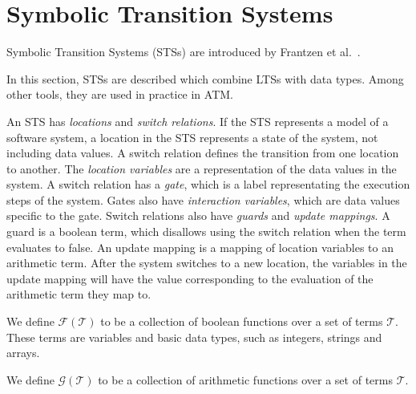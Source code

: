 \section{Symbolic Transition Systems}\label{sec:symbolic}
Symbolic Transition Systems (STSs) are introduced by Frantzen et al.~\cite{Frantzen:Symbolic}.

In this section, STSs are described which combine LTSs with data types. Among other tools, they are used in practice in ATM.

An STS has \textit{locations} and \textit{switch relations}. If the STS represents a model of a software system, a location in the STS represents a state of the system, not including data values. A switch relation defines the transition from one location to another. The \textit{location variables} are a representation of the data values in the system. A switch relation has a \textit{gate}, which is a label representating the execution steps of the system. Gates also have \textit{interaction variables}, which are data values specific to the gate. Switch relations also have \textit{guards} and \textit{update mappings}. A guard is a boolean term, which disallows using the switch relation when the term evaluates to false. An update mapping is a mapping of location variables to an arithmetic term. After the system switches to a new location, the variables in the update mapping will have the value corresponding to the evaluation of the arithmetic term they map to. 

\begin{definition}
We define $\mathcal{F}(\mathcal{T})$ to be a collection of boolean functions over a set of terms $\mathcal{T}$. These terms are variables and basic data types, such as integers, strings and arrays. 
\end{definition}

\begin{definition}
We define $\mathcal{G}(\mathcal{T})$ to be a collection of arithmetic functions over a set of terms $\mathcal{T}$.
\end{definition}

